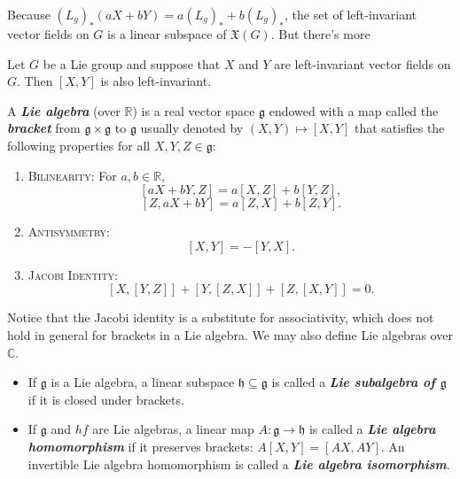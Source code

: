 \documentclass{article}
\numberwithin{equation}{section}
\newcommand{\R}{\mathbb{R}}
\newcommand{\C}{\mathbb{C}}
\newcommand{\gf}{\mathfrak{g}}
\newcommand{\X}{\mathfrak{X}}
\newcommand{\hf}{\mathfrak{h}}
\begin{document}
Because $(L_g)_*(aX+bY)=a(L_g)_*+b(L_g)_*$, the set of left-invariant vector fields on $G$ is a linear subspace of $\X(G)$. But there's more
\begin{prop}
	Let $G$ be a Lie group and suppose that $X$ and $Y$ are left-invariant vector fields on $G$. Then $[X,Y]$ is also left-invariant.
\end{prop}
\begin{defn}
	A \textbf{\textit{Lie algebra}} (over $\R$) is a real vector space $\gf$ endowed with a map called the \textbf{\textit{bracket}} from $\gf\times\gf$ to $\gf$ usually denoted by $(X,Y)\mapsto[X,Y]$ that satisfies the following properties for all $X,Y,Z\in\gf$:
	\begin{enumerate}
		\item {\scshape Bilinearity:} For $a,b\in\R$,
		\[[aX+bY,Z]=a[X,Z]+b[Y,Z],\]
		\[[Z,aX+bY]=a[Z,X]+b[Z,Y].\]
		\item {\scshape Antisymmetry:}
		\[[X,Y]=-[Y,X].\]
		\item {\scshape Jacobi Identity:}
		\[[X,[Y,Z]]+[Y,[Z,X]]+[Z,[X,Y]]=0.\]
	\end{enumerate}
\end{defn}
Notice that the Jacobi identity is a substitute for associativity, which does not hold in general for brackets in a Lie algebra. We may also define Lie algebras over $\C$.
\begin{defn}\leavevmode
	\begin{itemize}
		\item If $\gf$ is a Lie algebra, a linear subspace $\hf\subseteq\gf$ is called a \textbf{\textit{Lie subalgebra of $\gf$}} if it is closed under brackets.
		\item If $\gf$ and $hf$ are Lie algebras, a linear map $A:\gf\to\hf$ is called a \textbf{\textit{Lie algebra homomorphism}} if it preserves brackets: $A[X,Y]=[AX,AY]$. An invertible Lie algebra homomorphism is called a \textbf{\textit{Lie algebra isomorphism}}.
	\end{itemize}
\end{defn}
\end{document}
